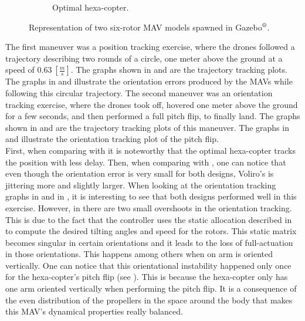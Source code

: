 \begin{figure}[!ht]
{\begin{subfigure}[b]{0.5\textwidth}
    \caption{Optimal hexa-copter.} \label{fig:Hexa_sim}
  \end{subfigure}}
  \caption{Representation of two six-rotor MAV models spawned in Gazebo$^\textrm{\textregistered}$.}
  \label{fig:Sim_six_rotors}
\end{figure}

The first maneuver was a position tracking exercise, where the drones followed a
trajectory describing two rounds of a circle, one meter above the ground at a speed
of $0.63\ [\frac{m}{s}]$. The graphs shown in  and
 are the trajectory tracking plots.
The graphs in  and 
illustrate the orientation errors produced by the MAVs while following
this circular trajectory.
The second maneuver was an orientation tracking exercise, where the drones took off,
hovered one meter above the ground for a few seconds, and then performed a full
pitch flip, to finally land. The graphs shown in 
and  are the trajectory tracking plots of this maneuver.
The graphs in  and  illustrate
the orientation tracking plot of the pitch flip.\\
First, when comparing  with
 it is noteworthy that the optimal hexa-copter
tracks the position with less delay. Then, when comparing 
with , one can notice that even though the orientation
error is very small for both designs, Voliro’s is jittering more and slightly larger.
When looking at the orientation tracking graphs in 
and in , it is interesting to see that both designs
performed well in this exercise. However, in 
there are two small overshoots in the orientation tracking. This is due to
the fact that the controller uses the static allocation described in 
to compute the desired tilting angles and speed for the rotors. This static matrix
becomes singular in certain orientations and it leads to the loss of full-actuation in
those orientations. This happens among others when on arm is oriented vertically.
One can notice that this orientational instability happened only once for
the hexa-copter’s pitch flip (see ). This is because
the hexa-copter only has one arm oriented vertically when performing the
pitch flip. It is a consequence of the even distribution of the propellers
in the space around the body that makes this MAV’s dynamical properties
really balanced.


